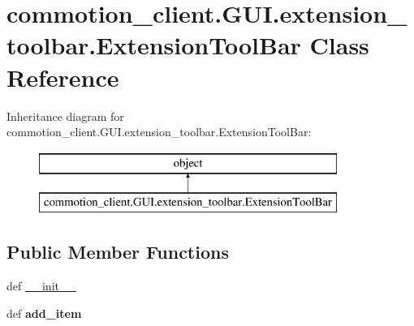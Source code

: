 \hypertarget{classcommotion__client_1_1GUI_1_1extension__toolbar_1_1ExtensionToolBar}{\section{commotion\+\_\+client.\+G\+U\+I.\+extension\+\_\+toolbar.\+Extension\+Tool\+Bar Class Reference}
\label{classcommotion__client_1_1GUI_1_1extension__toolbar_1_1ExtensionToolBar}
}
Inheritance diagram for commotion\+\_\+client.\+G\+U\+I.\+extension\+\_\+toolbar.\+Extension\+Tool\+Bar\+:\begin{figure}[H]
\begin{center}
\leavevmode
\includegraphics[height=2.000000cm]{classcommotion__client_1_1GUI_1_1extension__toolbar_1_1ExtensionToolBar}
\end{center}
\end{figure}
\subsection*{Public Member Functions}
\begin{DoxyCompactItemize}
\item 
def \hyperlink{classcommotion__client_1_1GUI_1_1extension__toolbar_1_1ExtensionToolBar_a29e92f0e66f5f056be55e3a5ef7f2fd8}{\+\_\+\+\_\+init\+\_\+\+\_\+}
\item 
\hypertarget{classcommotion__client_1_1GUI_1_1extension__toolbar_1_1ExtensionToolBar_a82e5c75a5e699eb6dd86810dab2b43a8}{def {\bfseries add\+\_\+item}}\label{classcommotion__client_1_1GUI_1_1extension__toolbar_1_1ExtensionToolBar_a82e5c75a5e699eb6dd86810dab2b43a8}

\end{DoxyCompactItemize}
